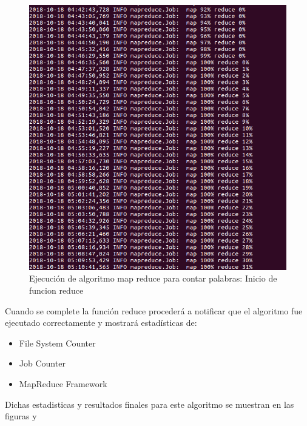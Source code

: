 \begin{figure}[!htbp]
	\hypertarget{fig:redi5}{\hspace{1pt}}
	\begin{center}
		\includegraphics[width=.9\textwidth]{capitulo4/images/ejemplo3.png}
		\caption{Ejecución de algoritmo map reduce para contar palabras: Inicio de funcion reduce}
		\label{fig:redi5}
	\end{center}
\end{figure}
\newpage
Cuando se complete la función reduce procederá a notificar que el algoritmo fue ejecutado correctamente y mostrará
estadísticas de:
\begin{itemize}
	\item File System Counter
	\item Job Counter
	\item MapReduce Framework
\end{itemize}
Dichas estadisticas y resultados finales para este algoritmo se muestran en las figuras  y 
